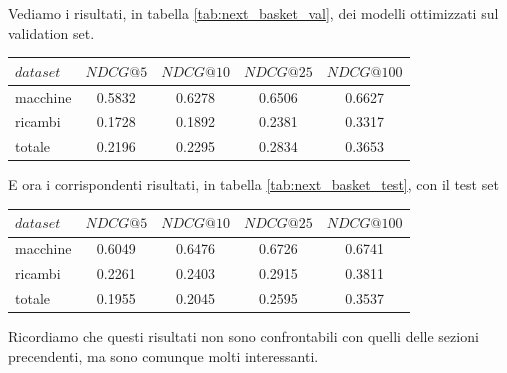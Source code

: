 Vediamo i risultati, in tabella \ref{tab:next_basket_val}, dei modelli ottimizzati sul validation set.
\begin{center}
    \begin{tabular}{|l|cccc|}
        \toprule
        $dataset$  &  $NDCG@5$ & $NDCG@10$  & $NDCG@25$ & $NDCG@100$  \\
        \midrule
        macchine & 0.5832 & 0.6278 & 0.6506 & 0.6627 \\
        ricambi & 0.1728 & 0.1892 & 0.2381 & 0.3317 \\
        totale  & 0.2196 & 0.2295 & 0.2834 & 0.3653 \\
    \bottomrule
    \end{tabular}
    \label{tab:next_basket_val}
\end{center}
E ora i corrispondenti risultati, in tabella \ref{tab:next_basket_test}, con il test set
\begin{center}
\begin{tabular}{|l|cccc|}
    \toprule
    $dataset$  &  $NDCG@5$ & $NDCG@10$  & $NDCG@25$ & $NDCG@100$  \\
    \midrule
    macchine & 0.6049 & 0.6476 & 0.6726 & 0.6741 \\
    ricambi & 0.2261 & 0.2403 & 0.2915 & 0.3811 \\
    totale  & 0.1955 & 0.2045 & 0.2595 & 0.3537 \\
\bottomrule
\end{tabular}
\label{tab:next_basket_test}
\end{center}
Ricordiamo che questi risultati non sono confrontabili con quelli delle sezioni precendenti, ma sono comunque molti interessanti.

